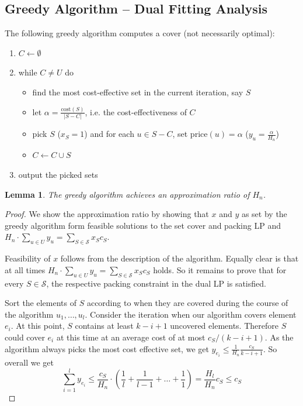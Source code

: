 \documentclass{article}
\newtheorem{lemma}{Lemma}
\begin{document}
\subsection{Greedy Algorithm -- Dual Fitting Analysis}
The following greedy algorithm computes a cover (not necessarily optimal):
\begin{enumerate}
\item $C\leftarrow \emptyset$
\item while $C\neq U$ do
	\begin{itemize}
	\item find the most cost-effective set in the current iteration, say $S$
	\item let $\alpha=\frac{\mathrm{cost}(S)}{|S-C|}$, i.e. the cost-effectiveness of $C$
	\item pick $S$ ($x_S=1$) and for each $u\in S-C$, set $\mathrm{price}(u)=\alpha$ ($y_u=\frac{\alpha}{H_n}$)
	\item $C\leftarrow C \cup S$
	\end{itemize}
\item output the picked sets
\end{enumerate}

\begin{lemma}
The greedy algorithm achieves an approximation ratio of $H_n$.
\end{lemma}
\begin{proof}
We show the approximation ratio by showing that $x$ and $y$ as set by the greedy algorithm form feasible solutions
to the set cover and packing LP and $H_n \cdot \sum_{u \in U} y_u = \sum_{S \in \mathcal{S}} x_S c_S$.

Feasibility of $x$ follows from the description of the algorithm. Equally clear is that at all times 
$H_n \cdot \sum_{u \in U} y_u = \sum_{S \in \mathcal{S}} x_S c_S$ holds. So it remains to prove that
for every $S\in \mathcal{S}$, the respective packing constraint in the dual LP is satisfied.

Sort the elements of $S$ according to when they are covered during the course of the algorithm $u_1, \dots, u_l$. 
Consider the iteration when our algorithm covers element $e_i$. At this point, $S$ contains at least
$k-i+1$ uncovered elements. Therefore $S$ could cover $e_i$ at this time at an average cost of at most
$c_S/(k-i+1)$. As the algorithm always picks the most cost effective set, we get
$y_{e_i} \leq \frac{1}{H_n} \frac{c_S}{k-i+1}$. So overall we get 
\[
\sum_{i=1}^{l} y_{e_i} \leq \frac{c_S}{H_n}\cdot (\frac{1}{l}+\frac{1}{l-1}+\dots +\frac{1}{1})= \frac{H_l}{H_n}c_S\leq c_S
\]

\end{proof}
\end{document}
